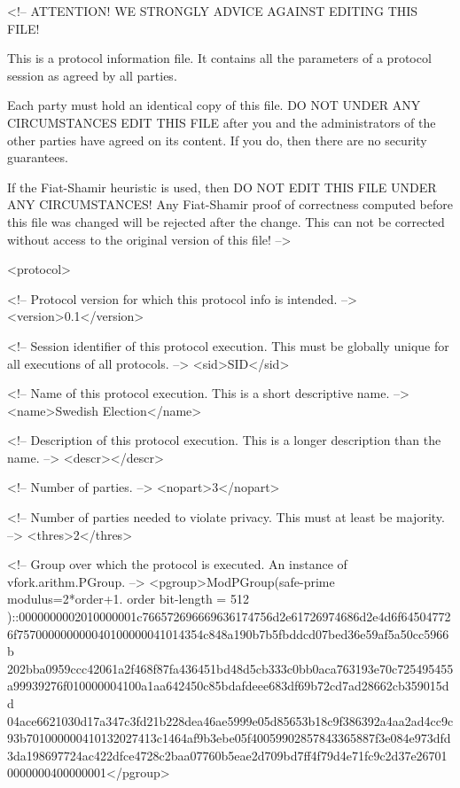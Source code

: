
<!-- ATTENTION! WE STRONGLY ADVICE AGAINST EDITING THIS FILE!
     
     This is a protocol information file. It contains all the 
     parameters of a protocol session as agreed by all parties.
     
     Each party must hold an identical copy of this file. DO NOT 
     UNDER ANY CIRCUMSTANCES EDIT THIS FILE after you and the 
     administrators of the other parties have agreed on its content.
     If you do, then there are no security guarantees.
     
     If the Fiat-Shamir heuristic is used, then DO NOT EDIT THIS 
     FILE UNDER ANY CIRCUMSTANCES! Any Fiat-Shamir proof of 
     correctness computed before this file was changed will be 
     rejected after the change. This can not be corrected without 
     access to the original version of this file! -->

<protocol>

   <!-- Protocol version for which this protocol info is intended. -->
   <version>0.1</version>

   <!-- Session identifier of this protocol execution. This must be 
        globally unique for all executions of all protocols. -->
   <sid>SID</sid>

   <!-- Name of this protocol execution. This is a short descriptive 
        name. -->
   <name>Swedish Election</name>

   <!-- Description of this protocol execution. This is a longer 
        description than the name. -->
   <descr></descr>

   <!-- Number of parties. -->
   <nopart>3</nopart>

   <!-- Number of parties needed to violate privacy. This must at 
        least be majority. -->
   <thres>2</thres>

   <!-- Group over which the protocol is executed. An instance of 
        vfork.arithm.PGroup. -->
   <pgroup>ModPGroup(safe-prime modulus=2*order+1. order bit-length = 512
)::0000000002010000001c766572696669636174756d2e61726974686d2e4d6f64504772
6f757000000000040100000041014354c848a190b7b5fbddcd07bed36e59af5a50cc5966b
202bba0959ccc42061a2f468f87fa436451bd48d5cb333c0bb0aca763193e70c725495455
a99939276f010000004100a1aa642450c85bdafdeee683df69b72cd7ad28662cb359015dd
04ace6621030d17a347c3fd21b228dea46ae5999e05d85653b18c9f386392a4aa2ad4cc9c
93b701000000410132027413c1464af9b3ebe05f40059902857843365887f3e084e973dfd
3da198697724ac422dfce4728c2baa07760b5eae2d709bd7ff4f79d4e71fc9c2d37e26701
0000000400000001</pgroup>

